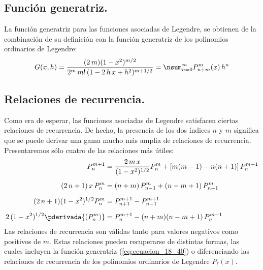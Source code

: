 \subsection{Función generatriz.}

La función generatriz para las funciones asociadas de Legendre, se obtienen de la combinación de su definición con la función generatriz de los polinomios ordinarios de Legendre:
\begin{align}
G (x, h) = \dfrac{(2 \, m)(1 - x^{2})^{m/2}}{2^{m} \, m! \, (1 - 2 \, h \, x + h^{2})^{m+1/2}} = \nsum_{n=0}^{\infty} P_{n+m}^{m} (x) \, h^{n}
\label{eq:ecuacion_18_40}
\end{align}

\subsection{Relaciones de recurrencia.}

Como era de esperar, las funciones asociadas de Legendre satisfacen ciertas relaciones de recurrencia. De hecho, la presencia de los dos índices $n$ y $m$ significa que se puede derivar una gama mucho más amplia de relaciones de recurrencia. Presentaremos sólo cuatro de las relaciones más útiles:
\begin{align*}
P_{n}^{m+1} &= \dfrac{2 \, m \, x}{(1 - x^{2})^{1/2}} P_{n}^{m} + [m (m - 1) - n (n + 1)] \, P_{n}^{m-1} \\[0.5em]
(2 \, n + 1) \, x \, P_{n}^{m} &= (n + m) \, P_{n-1}^{m} + (n - m + 1) \, P_{n+1}^{m} \\[0.5em]
(2 \, n + 1)(1 -  x^{2})^{1/2} P_{n}^{m} &= P_{n+1}^{m+1} - P_{n-1}^{m+1} \\[0.5em]
2 \, (1 - x^{2})^{1/2} \pderivada{(P_{n}^{m})} &= P_{n}^{m+1} - (n + m)(n - m + 1) \, P_{n}^{m-1}
\end{align*}
Las relaciones de recurrencia son válidas tanto para valores negativos como positivos de $m$. Estas relaciones pueden recuperarse de distintas formas, las cuales incluyen la función generatriz (\ref{eq:ecuacion_18_40}) o diferenciando las relaciones de recurrencia de los polinomios ordinarios de Legendre $P_{\ell} (x)$.



